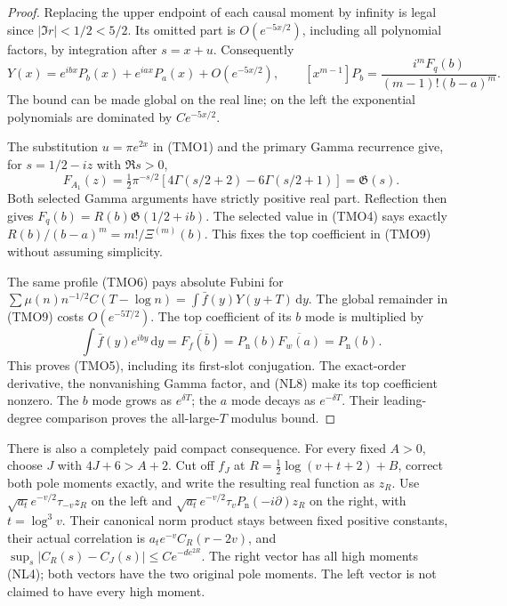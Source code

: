 \documentclass[11pt]{article}
\theoremstyle{remark}\newtheorem{remark}[theorem]{Remark}
\newcommand{\dd}{\,\mathrm d}
\begin{document}
\begin{proof}
Replacing the upper endpoint of each causal moment by infinity
is legal since \(|\Im r|<1/2<5/2\).
Its omitted part is \(O(e^{-5x/2})\), including all polynomial
factors, by integration after \(s=x+u\).
Consequently
\[
 Y(x)=e^{ibx}P_b(x)+e^{iax}P_a(x)+O(e^{-5x/2}),\qquad
 [x^{m-1}]P_b
       =\frac{i^mF_q(b)}{(m-1)!(b-a)^m}.                      \tag{TMO9}
\]
The bound can be made global on the real line; on the left
the exponential polynomials are dominated by \(Ce^{-5x/2}\).

The substitution \(u=\pi e^{2x}\) in (TMO1) and the primary
Gamma recurrence \cite[5.2.1, 5.5.1]{DLMFGamma} give, for
\(s=1/2-iz\) with \(\Re s>0\),
\[
 F_{A_1}(z)=\tfrac12\pi^{-s/2}
                  [4\Gamma(s/2+2)-6\Gamma(s/2+1)]
                          =\mathfrak G(s).                   \tag{TMO10}
\]
Both selected Gamma arguments have strictly positive real part.
Reflection then gives \(F_q(b)=R(b)\mathfrak G(1/2+ib)\).
The selected value in (TMO4) says exactly
\(R(b)/(b-a)^m=m!/\Xi^{(m)}(b)\).
This fixes the top coefficient in (TMO9) without assuming simplicity.

The same profile (TMO6) pays absolute Fubini for
\(\sum\mu(n)n^{-1/2}C(T-\log n)
 =\int\bar f(y)Y(y+T)\dd y\).
The global remainder in (TMO9) costs \(O(e^{-5T/2})\).
The top coefficient of its \(b\) mode is multiplied by
\[
 \int\bar f(y)e^{iby}\dd y
      =\overline{F_f(\bar b)}
      =P_{\mathrm n}(b)\overline{F_w(a)}=P_{\mathrm n}(b).
\]
This proves (TMO5), including its first-slot conjugation.
The exact-order derivative, the nonvanishing Gamma factor,
and (NL8) make its top coefficient nonzero.
The \(b\) mode grows as \(e^{\delta T}\);
the \(a\) mode decays as \(e^{-\delta T}\).
Their leading-degree comparison proves the all-large-\(T\)
modulus bound.
\end{proof}

There is also a completely paid compact consequence.
For every fixed \(A>0\), choose \(J\) with \(4J+6>A+2\).
Cut off \(f_J\) at
\(R=\frac12\log(v+t+2)+B\), correct both pole moments exactly,
and write the resulting real function as \(z_R\).
Use \(\sqrt{a_t}e^{-v/2}\tau_{-v}z_R\) on the left and
\(\sqrt{a_t}e^{-v/2}\tau_vP_{\mathrm n}(-i\partial)z_R\)
on the right, with \(t=\log^3v\).
Their canonical norm product stays between fixed positive
constants, their actual correlation is
\(a_te^{-v}C_R(r-2v)\), and
\(\sup_s|C_R(s)-C_J(s)|\le Ce^{-d e^{2R}}\).
The right vector has all high moments (NL4);
both vectors have the two original pole moments.
The left vector is not claimed to have every high moment.
\end{document}
